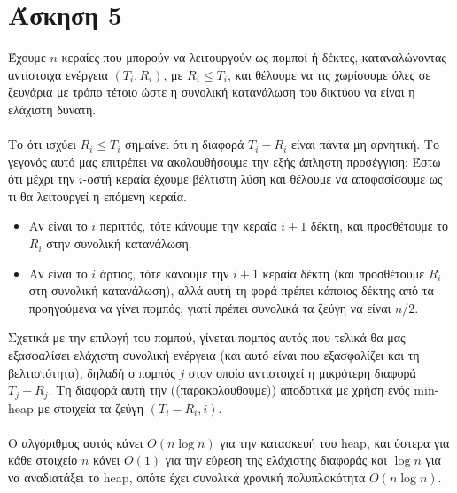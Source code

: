 \documentclass[12pt,a4paper]{article}
\begin{document}
  \section{Άσκηση 5}

    Έχουμε \( n \) κεραίες που μπορούν να  λειτουργούν ως πομποί ή δέκτες,
    καταναλώνοντας αντίστοιχα ενέργεια \( (T_i, R_i) \), με \( R_i \le T_i \),
    και θέλουμε να τις χωρίσουμε όλες σε ζευγάρια με τρόπο τέτοιο ώστε η
    συνολική κατανάλωση του δικτύου να είναι η ελάχιστη δυνατή.\\
    \\
    Το ότι ισχύει \( R_i \le T_i \) σημαίνει ότι η διαφορά \( T_i - R_i \)
    είναι πάντα μη αρνητική. Το γεγονός αυτό μας επιτρέπει να ακολουθήσουμε την
    εξής άπληστη προσέγγιση: Έστω ότι μέχρι την \( i \)-οστή
    κεραία έχουμε βέλτιστη λύση και θέλουμε να αποφασίσουμε ως τι θα 
    λειτουργεί η επόμενη κεραία.
    \begin{itemize}
      \item Αν είναι το \( i \) περιττός, τότε κάνουμε 
            την κεραία \( i + 1 \) δέκτη, και προσθέτουμε το \( R_i \) στην
            συνολική κατανάλωση.
      \item Αν είναι το \( i \) άρτιος, τότε κάνουμε την \( i + 1 \) κεραία
            δέκτη (και προσθέτουμε \( R_i \) στη συνολική κατανάλωση), αλλά αυτή
            τη φορά πρέπει κάποιος δέκτης από τα προηγούμενα να
            γίνει πομπός, γιατί πρέπει συνολικά τα ζεύγη να είναι \( n/2 \).
    \end{itemize}
    Σχετικά με την επιλογή του πομπού, γίνεται πομπός αυτός που τελικά θα μας
    εξασφαλίσει ελάχιστη συνολική ενέργεια (και αυτό είναι που εξασφαλίζει και
    τη βελτιστότητα), δηλαδή ο πομπός \( j \) στον οποίο αντιστοιχεί η μικρότερη
    διαφορά \( T_j - R_j \). Τη διαφορά αυτή την ((παρακολουθούμε)) αποδοτικά
    με χρήση ενός {\latintext min-heap} με στοιχεία τα ζεύγη \( (Τ_i - R_i,
    i) \).\\
    \\
    O αλγόριθμος αυτός κάνει \( Ο(n\log{n}) \) για την κατασκευή του {\latintext
    heap}, και ύστερα για κάθε στοιχείο \( n \) κάνει \( O(1) \) για την
    εύρεση της ελάχιστης διαφοράς και \( \log{n} \) για να αναδιατάξει το
    {\latintext heap}, οπότε έχει συνολικά χρονική πολυπλοκότητα \( O(n\log{n})
    \).
\end{document}
